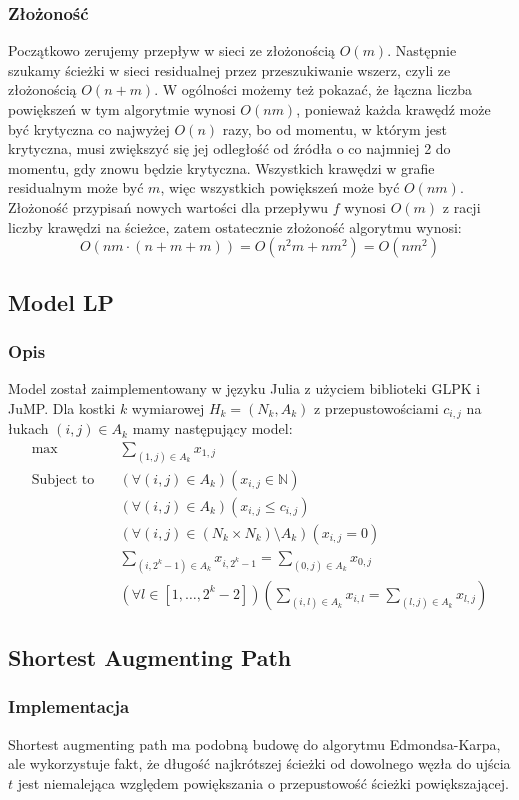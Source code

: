 \documentclass{article}
\begin{document}
\subsubsection{Złożoność}
Początkowo zerujemy przepływ w sieci ze złożonością $O(m)$.
Następnie szukamy ścieżki w sieci residualnej przez przeszukiwanie wszerz, czyli ze złożonością $O(n+m)$. W ogólności możemy też pokazać, że łączna liczba powiększeń w tym algorytmie wynosi $O(nm)$, ponieważ każda krawędź może być krytyczna co najwyżej $O(n)$ razy, bo od momentu, w którym jest krytyczna, musi zwiększyć się jej odległość od źródła o co najmniej 2 do momentu, gdy znowu będzie krytyczna. Wszystkich krawędzi w grafie residualnym może być $m$, więc wszystkich powiększeń może być $O(nm)$. Złożoność przypisań  nowych wartości dla przepływu $f$ wynosi $O(m)$ z racji liczby krawędzi na ścieżce, zatem ostatecznie złożoność algorytmu wynosi:
$$O(nm\cdot(n+m+m))=O(n^2m+nm^2)=O(nm^2)$$

\subsection{Model LP}
\subsubsection{Opis}
Model został zaimplementowany w języku Julia z użyciem biblioteki GLPK i JuMP. Dla kostki $k$ wymiarowej $H_k=(N_k, A_k)$ z przepustowościami $c_{i,j}$ na łukach $(i,j)\in A_k$ mamy następujący model:
$$ \begin{aligned}
\max\quad & \sum_{(1,j)\in A_k} x_{1,j}\\
\text{Subject to} \quad & (\forall (i,j)\in A_k)( x_{i,j} \in \mathbb{N})\\
 & (\forall (i,j)\in A_k)( x_{i,j} \leq c_{i,j})\\
 & (\forall (i,j)\in (N_k\times N_k) \setminus A_k)( x_{i,j} = 0 )\\
 &  \sum_{(i,2^{k}-1)\in A_k} x_{i,2^{k}-1} = \sum_{(0,j)\in A_k} x_{0,j} \\
 & (\forall l\in [1,\ldots, 2^{k} - 2])\left( \sum_{(i,l)\in A_k} x_{i,l} = \sum_{(l,j)\in A_k} x_{l,j}\right)
\end{aligned} $$

\subsection{Shortest Augmenting Path}
\subsubsection{Implementacja}
Shortest augmenting path ma podobną budowę do algorytmu Edmondsa-Karpa, ale wykorzystuje fakt, że długość najkrótszej ścieżki od dowolnego węzła do ujścia $t$ jest niemalejąca względem powiększania o przepustowość ścieżki powiększającej. 
\end{document}
